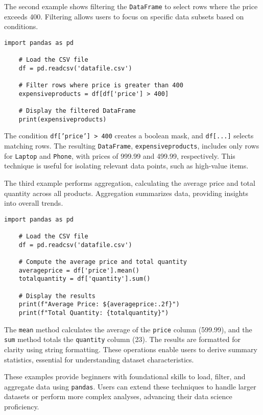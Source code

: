 The second example shows filtering the \texttt{DataFrame} to select rows where the price exceeds 400. Filtering allows users to focus on specific data subsets based on conditions.

\begin{lstlisting}[style=pythonstyle,caption={Filtering rows in a DataFrame},label={lst:pandas_filter}]
	import pandas as pd
	
	# Load the CSV file
	df = pd.readcsv('datafile.csv')
	
	# Filter rows where price is greater than 400
	expensiveproducts = df[df['price'] > 400]
	
	# Display the filtered DataFrame
	print(expensiveproducts)
\end{lstlisting}
The condition \texttt{df['price'] > 400} creates a boolean mask, and \texttt{df[...]} selects matching rows. The resulting \texttt{DataFrame}, \texttt{expensiveproducts}, includes only rows for \texttt{Laptop} and \texttt{Phone}, with prices of 999.99 and 499.99, respectively. This technique is useful for isolating relevant data points, such as high-value items.

The third example performs aggregation, calculating the average price and total quantity across all products. Aggregation summarizes data, providing insights into overall trends.

\begin{lstlisting}[style=pythonstyle,caption={Aggregating data in a DataFrame},label={lst:pandas_aggregate}]
	import pandas as pd
	
	# Load the CSV file
	df = pd.readcsv('datafile.csv')
	
	# Compute the average price and total quantity
	averageprice = df['price'].mean()
	totalquantity = df['quantity'].sum()
	
	# Display the results
	print(f"Average Price: ${averageprice:.2f}")
	print(f"Total Quantity: {totalquantity}")
\end{lstlisting}
The \texttt{mean} method calculates the average of the \texttt{price} column (599.99), and the \texttt{sum} method totals the \texttt{quantity} column (23). The results are formatted for clarity using string formatting. These operations enable users to derive summary statistics, essential for understanding dataset characteristics.

These examples provide beginners with foundational skills to load, filter, and aggregate data using \texttt{pandas}. Users can extend these techniques to handle larger datasets or perform more complex analyses, advancing their data science proficiency.

